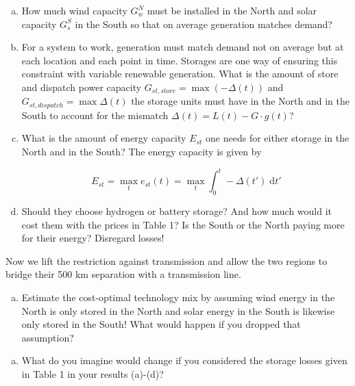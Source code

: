 \documentclass[11pt,a4paper,fleqn]{scrartcl}
\begin{document}
\begin{enumerate}[(a)]
 \item How much wind capacity $G^{N}_{w}$ must be installed in the North and solar capacity $G_s^S$ in the South so that on average generation matches demand?

 \item For a system to work, generation must match demand not on average but at each location and each point in time. Storages are one way of ensuring this constraint with variable renewable generation. What is the amount of store and dispatch power capacity $G_{st,store}=\max(-\Delta(t))$ and $G_{st,dispatch} = \max \Delta(t)$ the storage units must have in the North and in the South to account for the mismatch $\Delta(t)=L(t)-G\cdot g(t)$?
\newpage
 \item What is the amount of energy capacity $E_{st}$ one needs for either storage in the North and in the South? The energy capacity is given by

       \begin{equation*}
        E_{st} = \max_t e_{st}(t) = \max_t \int_{0}^{t} -\Delta(t') \;\mathrm{d}t'
       \end{equation*}

 \item Should they choose hydrogen or battery storage? And how much would it cost them with the prices in Table 1? Is the South or the North paying more for their energy? Disregard losses!


\end{enumerate}
Now we lift the restriction against transmission and allow the two regions to bridge their 500 km separation with a transmission line.

\begin{enumerate}[(e)]
	\item   Estimate the cost-optimal technology mix by assuming wind energy in the North is only stored in the North and solar energy in the South is likewise only stored in the South! What would happen if you dropped that assumption?
\end{enumerate}
\begin{enumerate}[(f)]
	\item What do you imagine would change if you considered the storage losses given in Table 1 in your results (a)-(d)?
\end{enumerate}
\end{document}
